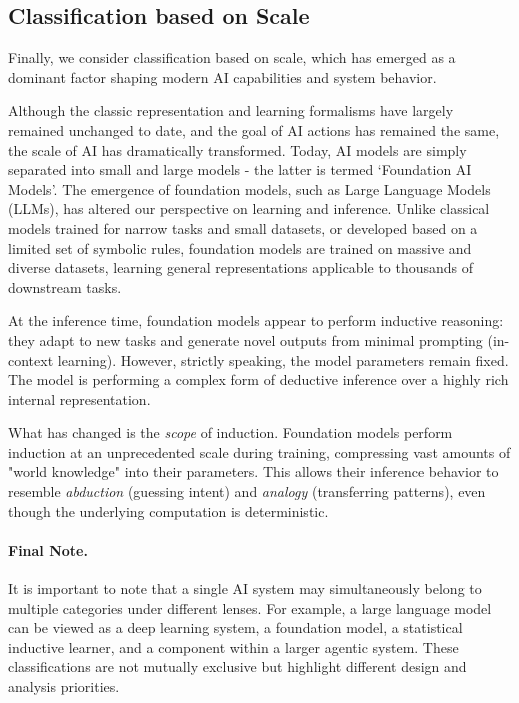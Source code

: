\documentclass[12pt]{article}
\begin{document}
\subsection{Classification based on Scale}
Finally, we consider classification based on scale, which has emerged as a dominant factor shaping modern AI capabilities and system behavior.

Although the classic representation and learning formalisms have largely remained unchanged to date, and the goal of AI actions has remained the same, the scale of AI has dramatically transformed. Today, AI models are simply separated into small and large models - the latter is termed `Foundation AI Models'. The emergence of foundation models, such as Large Language Models (LLMs), has altered our perspective on learning and inference. Unlike classical models trained for narrow tasks and small datasets, or developed based on a limited set of symbolic rules, foundation models are trained on massive and diverse datasets, learning general representations applicable to thousands of downstream tasks.

At the inference time, foundation models appear to perform inductive reasoning: they adapt to new tasks and generate novel outputs from minimal prompting (in-context learning). However, strictly speaking, the model parameters remain fixed. The model is performing a complex form of deductive inference over a highly rich internal representation.

What has changed is the \textit{scope} of induction. Foundation models perform induction at an unprecedented scale during training, compressing vast amounts of "world knowledge" into their parameters. This allows their inference behavior to resemble \textit{abduction} (guessing intent) and \textit{analogy} (transferring patterns), even though the underlying computation is deterministic.

\paragraph{Final Note.} It is important to note that a single AI system may simultaneously belong to multiple categories under different lenses. For example, a large language model can be viewed as a deep learning system, a foundation model, a statistical inductive learner, and a component within a larger agentic system. These classifications are not mutually exclusive but highlight different design and analysis priorities.
\end{document}
